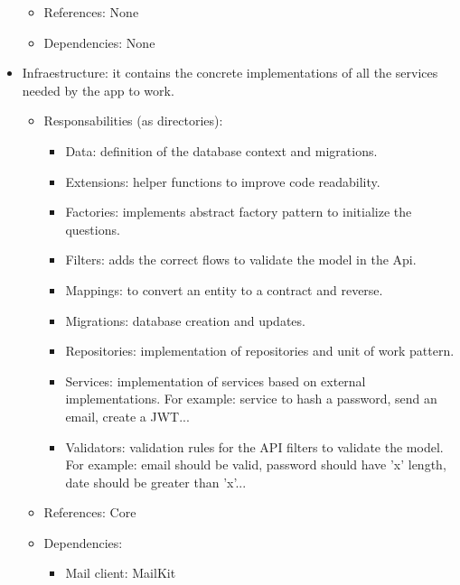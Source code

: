 \begin{itemize}[noitemsep]
\begin{itemize}[noitemsep]
                        \item References: None
                        \item Dependencies: None
                    \end{itemize}
                \item Infraestructure: it contains the concrete implementations of all the services needed by the app to work.
                    \begin{itemize}[noitemsep]
                        \item Responsabilities (as directories):
                            \begin{itemize}[noitemsep]
                                \item Data: definition of the database context and migrations.
                                \item Extensions: helper functions to improve code readability.
                                \item Factories: implements abstract factory pattern to initialize the questions.
                                \item Filters: adds the correct flows to validate the model in the Api.
                                \item Mappings: to convert an entity to a contract and reverse.
                                \item Migrations: database creation and updates.
                                \item Repositories: implementation of repositories and unit of work pattern.
                                \item Services: implementation of services based on external implementations. For example: service to hash a password, send an email, create a JWT...
                                \item Validators: validation rules for the API filters to validate the model. For example: email should be valid, password should have 'x' length, date should be greater than 'x'...
                            \end{itemize}
                        \item References: Core
                        \item Dependencies:
                            \begin{itemize}[noitemsep]
                                \item Mail client: MailKit

\end{itemize}
\end{itemize}
\end{itemize}
